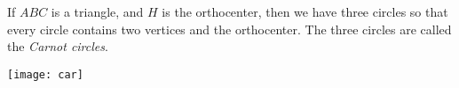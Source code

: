 \documentclass[12pt]{article}
\begin{document}
If $ABC$ is a triangle, and $H$ is the orthocenter, then we have
three circles so that every circle contains two vertices and
the orthocenter. The three circles are called the \emph{Carnot
circles}.
\begin{center}
\texttt{[image: car]}
\end{center}
\end{document}
